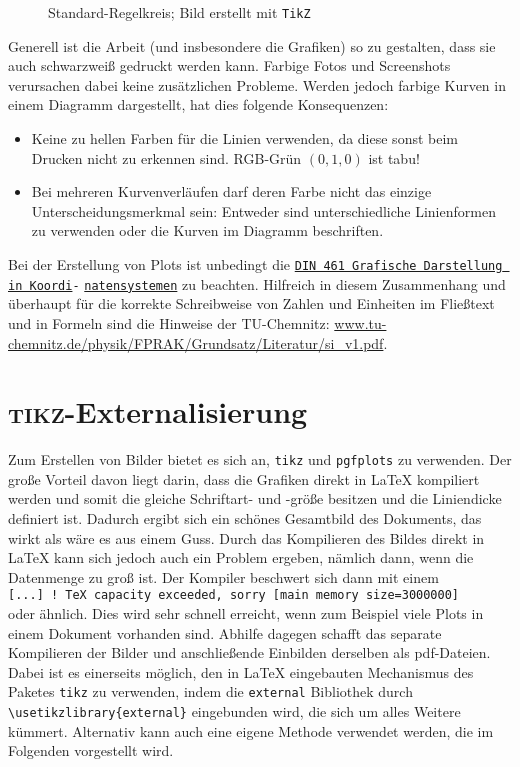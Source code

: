 \begin{figure}[htp]
	\centering
	\caption{Standard-Regelkreis; Bild erstellt mit \texttt{TikZ}}
	\label{fig:Standardregelkreis}
\end{figure}

Generell ist die Arbeit (und insbesondere die Grafiken) so zu gestalten, dass sie auch schwarzweiß gedruckt werden kann.
Farbige Fotos und Screenshots verursachen dabei \iA keine zusätzlichen Probleme.
Werden jedoch \zB farbige Kurven in einem Diagramm dargestellt, hat dies folgende Konsequenzen:
\begin{itemize}
	\item Keine zu hellen Farben für die Linien verwenden, da diese sonst beim Drucken nicht zu erkennen sind.
	RGB-Grün $(0,1,0)$ ist tabu!
	\item Bei mehreren Kurvenverläufen darf deren Farbe nicht das einzige Unterscheidungsmerkmal sein: Entweder sind unterschiedliche Linienformen zu verwenden oder die Kurven im Diagramm beschriften.
\end{itemize}

Bei der Erstellung von Plots ist unbedingt die \href{http://de.wikipedia.org/wiki/DIN_461}{\texttt{DIN 461 Grafische Darstellung in Koordi}}\texttt{-} \href{http://de.wikipedia.org/wiki/DIN_461}{\texttt{natensystemen}} zu beachten.
Hilfreich in diesem Zusammenhang und überhaupt für die korrekte Schreibweise von Zahlen und Einheiten im Fließtext und in Formeln sind die Hinweise der TU-Chemnitz: \url{www.tu-chemnitz.de/physik/FPRAK/Grundsatz/Literatur/si_v1.pdf}.

\section{\textsc{tikz}-Externalisierung}
\label{sec:External}
Zum Erstellen von Bilder bietet es sich an, \texttt{tikz} und \texttt{pgfplots} zu verwenden.
Der große Vorteil davon liegt darin, dass die Grafiken direkt in \LaTeX{} kompiliert werden und somit die gleiche Schriftart- und -größe besitzen und die Liniendicke definiert ist.
Dadurch ergibt sich ein schönes Gesamtbild des Dokuments, das wirkt als wäre es aus einem Guss.
Durch das Kompilieren des Bildes direkt in \LaTeX{} kann sich jedoch auch ein Problem ergeben, nämlich dann, wenn die Datenmenge zu groß ist.
Der Kompiler beschwert sich dann mit einem\\
\texttt{[...] ! TeX capacity exceeded, sorry [main memory size=3000000]}\\
oder ähnlich.
Dies wird sehr schnell erreicht, wenn zum Beispiel viele Plots in einem Dokument vorhanden sind.
Abhilfe dagegen schafft das separate Kompilieren der Bilder und anschließende Einbilden derselben als pdf-Dateien.
Dabei ist es einerseits möglich, den in \LaTeX{} eingebauten Mechanismus des Paketes \texttt{tikz} zu verwenden, indem die \texttt{external} Bibliothek durch \verb|\usetikzlibrary{external}| eingebunden wird, die sich um alles Weitere kümmert.
Alternativ kann auch eine eigene Methode verwendet werden, die im Folgenden vorgestellt wird.

